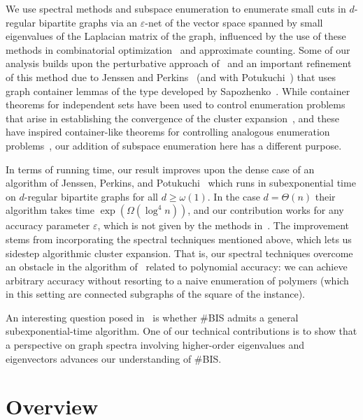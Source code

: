 \documentclass[11pt,letterpaper]{amsart}
\theoremstyle{definition}
\newcommand{\eps}{\varepsilon}
\begin{document}
We use spectral methods and subspace enumeration to enumerate small cuts in $d$-regular bipartite graphs via an $\eps$-net of the vector space spanned by small eigenvalues of the Laplacian matrix of the graph, influenced by the use of these methods in combinatorial optimization~\cite{ABS10,Kol10,KT07} and approximate counting. 
Some of our analysis builds upon the perturbative approach of~\cite{HPR19a,JKP19b} and
an important refinement of this method due to Jenssen and Perkins~\cite{JP20} (and with Potukuchi~\cite{JPP21}) that uses graph container lemmas of the type developed by Sapozhenko~\cite{S87,S01b}. 
While container theorems for independent sets have been used to control enumeration problems that arise in establishing the convergence of the cluster expansion~\cite{JP20,JPP21,JPP22}, and these have inspired container-like theorems for controlling analogous enumeration problems~\cite{CDF+22a}, our addition of subspace enumeration here has a different purpose. 

In terms of running time, our result improves upon the dense case of an algorithm of Jenssen, Perkins, and Potukuchi~\cite{JPP22} which runs in subexponential time on $d$-regular bipartite graphs for all $d\ge\omega(1)$. In the case $d=\Theta(n)$ their algorithm takes time $\exp(\Omega(\log^4 n))$, and our contribution works for any accuracy parameter $\eps$, which is not given by the methods in~\cite{JPP22}. 
The improvement stems from incorporating the spectral techniques mentioned above, which lets us sidestep algorithmic cluster expansion. 
That is, our spectral techniques overcome an obstacle in the algorithm of~\cite{JPP22} related to polynomial accuracy: we can achieve arbitrary accuracy without resorting to a naive enumeration of polymers (which in this setting are connected subgraphs of the square of the instance). 


An interesting question posed in~\cite{JPP22} is whether \#BIS admits a general subexponential-time algorithm. 
One of our technical contributions is to show that a perspective on graph spectra involving higher-order eigenvalues and eigenvectors advances our understanding of \#BIS.


\section{Overview}
\end{document}
